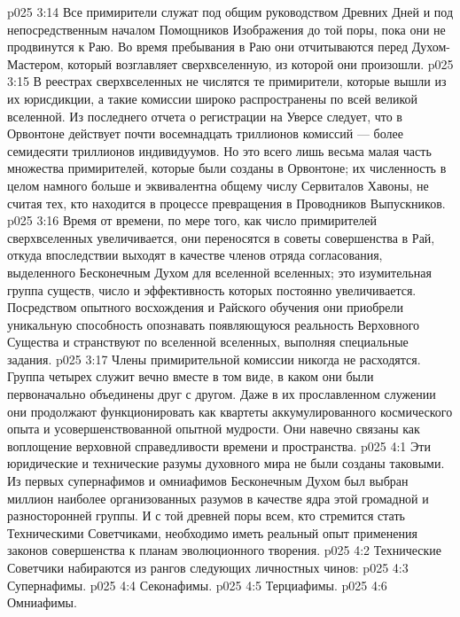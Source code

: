 \vs p025 3:14 \pc Все примирители служат под общим руководством Древних Дней и под непосредственным началом Помощников Изображения до той поры, пока они не продвинутся к Раю. Во время пребывания в Раю они отчитываются перед Духом\hyp{}Мастером, который возглавляет сверхвселенную, из которой они произошли.
\vs p025 3:15 В реестрах сверхвселенных не числятся те примирители, которые вышли из их юрисдикции, а такие комиссии широко распространены по всей великой вселенной. Из последнего отчета о регистрации на Уверсе следует, что в Орвонтоне действует почти восемнадцать триллионов комиссий --- более семидесяти триллионов индивидуумов. Но это всего лишь весьма малая часть множества примирителей, которые были созданы в Орвонтоне; их численность в целом намного больше и эквивалентна общему числу Сервиталов Хавоны, не считая тех, кто находится в процессе превращения в Проводников Выпускников.
\vs p025 3:16 Время от времени, по мере того, как число примирителей сверхвселенных увеличивается, они переносятся в советы совершенства в Рай, откуда впоследствии выходят в качестве членов отряда согласования, выделенного Бесконечным Духом для вселенной вселенных; это изумительная группа существ, число и эффективность которых постоянно увеличивается. Посредством опытного восхождения и Райского обучения они приобрели уникальную способность опознавать появляющуюся реальность Верховного Существа и странствуют по вселенной вселенных, выполняя специальные задания.
\vs p025 3:17 Члены примирительной комиссии никогда не расходятся. Группа четырех служит вечно вместе в том виде, в каком они были первоначально объединены друг с другом. Даже в их прославленном служении они продолжают функционировать как квартеты аккумулированного космического опыта и усовершенствованной опытной мудрости. Они навечно связаны как воплощение верховной справедливости времени и пространства.
\vs p025 4:1 Эти юридические и технические разумы духовного мира не были созданы таковыми. Из первых супернафимов и омниафимов Бесконечным Духом был выбран миллион наиболее организованных разумов в качестве ядра этой громадной и разносторонней группы. И с той древней поры всем, кто стремится стать Техническими Советчиками, необходимо иметь реальный опыт применения законов совершенства к планам эволюционного творения.
\vs p025 4:2 \pc Технические Советчики набираются из рангов следующих личностных чинов:
\vs p025 4:3 \bibnobreakspace Супернафимы.
\vs p025 4:4 \bibnobreakspace Секонафимы.
\vs p025 4:5 \bibnobreakspace Терциафимы.
\vs p025 4:6 \bibnobreakspace Омниафимы.
